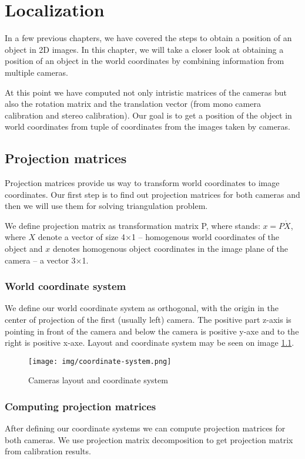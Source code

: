 \chapter{Localization}

In a few previous chapters, we have covered the steps to obtain a position of
an object in 2D images. In this chapter, we will take a closer look at
obtaining a position of an object in the world coordinates by combining
information from multiple cameras.

At this point we have computed not only intristic matrices of the cameras but
also the rotation matrix and the translation vector (from mono camera
calibration and stereo calibration). Our goal is to get a position of the
object in world coordinates from tuple of coordinates from the images taken by
cameras.

\section{Projection matrices}
Projection matrices provide us way to transform world coordinates to image
coordinates. Our first step is to find out projection matrices for both cameras
and then we will use them for solving triangulation problem.

We define projection matrix as transformation matrix P, where stands: $x = P
\dot X$, where $X$ denote a vector of size 4$\times$1 -- homogenous world coordinates
of the object and $x$ denotes homogenous object coordinates in the image plane
of the camera -- a vector 3$\times$1.

\subsection{World coordinate system}
We define our world coordinate system as orthogonal, with the origin in the
center of projection of the first (usually left) camera. The positive part
z-axis is pointing in front of the camera and below the camera is positive
y-axe and to the right is positive x-axe. Layout and coordinate system may be
seen on image \ref{fig:coordinate-system}.


\begin{figure}
\centering
\texttt{[image: img/coordinate-system.png]}
\caption{Cameras layout and coordinate system}
\label{fig:coordinate-system}
\end{figure}

\subsection{Computing projection matrices}
After defining our coordinate systems we can compute projection matrices for
both cameras. We use projection matrix decomposition to get projection matrix
from calibration results.

